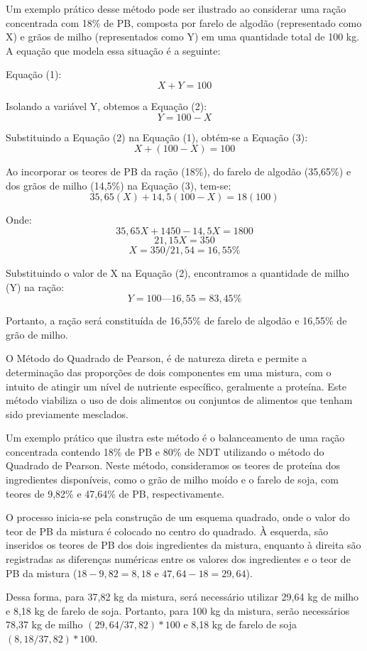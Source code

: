 Um exemplo prático desse método pode ser ilustrado ao considerar uma ração concentrada com 18\% de \gls{PB}, composta por farelo de algodão (representado como X) e grãos de milho (representados como Y) em uma quantidade total de 100 kg. A equação que modela essa situação é a seguinte:

Equação (1): 
\[X + Y = 100\]

Isolando a variável Y, obtemos a Equação (2):
\[Y = 100 - X\]

Substituindo a Equação (2) na Equação (1), obtém-se a Equação (3): 
\[
  X + (100 - X) = 100
\]

Ao incorporar os teores de \gls{PB} da ração (18\%), do farelo de algodão (35,65\%) e dos grãos de milho (14,5\%) na Equação (3), tem-se:
\[
  35,65 (X) + 14,5 (100 - X) = 18 (100)
\]

Onde:
\[35,65X + 1450 - 14,5X = 1800\]
\[21,15X = 350\]
\[X = 350 / 21,54 = 16,55\%\]

Substituindo o valor de X na Equação (2), encontramos a quantidade de milho (Y) na ração:
\[Y = 100 — 16,55 = 83,45\%\]

Portanto, a ração será constituída de 16,55\% de farelo de algodão e 16,55\% de grão de milho.

O Método do Quadrado de Pearson, é de natureza direta e permite a determinação das proporções de dois componentes em uma mistura, com o intuito de atingir um nível de nutriente específico, geralmente a proteína. Este método viabiliza o uso de dois alimentos ou conjuntos de alimentos que tenham sido previamente mesclados.

Um exemplo prático que ilustra este método é o balanceamento de uma ração concentrada contendo 18\% de \gls{PB} e 80\% de \gls{NDT} utilizando o método do Quadrado de Pearson. Neste método, consideramos os teores de proteína dos ingredientes disponíveis, como o grão de milho moído e o farelo de soja, com teores de 9,82\% e 47,64\% de \gls{PB}, respectivamente.

O processo inicia-se pela construção de um esquema quadrado, onde o valor do teor de \gls{PB} da mistura é colocado no centro do quadrado. À esquerda, são inseridos os teores de \gls{PB} dos dois ingredientes da mistura, enquanto à direita são registradas as diferenças numéricas entre os valores dos ingredientes e o teor de \gls{PB} da mistura ($18 - 9,82 = 8,18$ e $47,64 - 18 = 29,64$).

Dessa forma, para 37,82 kg da mistura, será necessário utilizar 29,64 kg de milho e 8,18 kg de farelo de soja. Portanto, para 100 kg da mistura, serão necessários 78,37 kg de milho $(29,64 / 37,82)*100$ e 8,18 kg de farelo de soja $(8,18/37,82)*100$.

